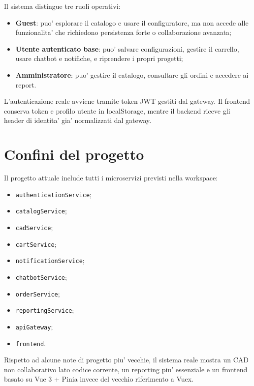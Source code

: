 Il sistema distingue tre ruoli operativi:

\begin{itemize}
\item \textbf{Guest}: puo' esplorare il catalogo e usare il configuratore, ma non accede alle funzionalita' che richiedono persistenza forte o collaborazione avanzata;
\item \textbf{Utente autenticato base}: puo' salvare configurazioni, gestire il carrello, usare chatbot e notifiche, e riprendere i propri progetti;
\item \textbf{Amministratore}: puo' gestire il catalogo, consultare gli ordini e accedere ai report.
\end{itemize}

L'autenticazione reale avviene tramite token JWT gestiti dal gateway. Il frontend conserva token e profilo utente in localStorage, mentre il backend riceve gli header di identita' gia' normalizzati dal gateway.

\section{Confini del progetto}

Il progetto attuale include tutti i microservizi previsti nella workspace:

\begin{itemize}
\item \texttt{authenticationService};
\item \texttt{catalogService};
\item \texttt{cadService};
\item \texttt{cartService};
\item \texttt{notificationService};
\item \texttt{chatbotService};
\item \texttt{orderService};
\item \texttt{reportingService};
\item \texttt{apiGateway};
\item \texttt{frontend}.
\end{itemize}

Rispetto ad alcune note di progetto piu' vecchie, il sistema reale mostra un CAD non collaborativo lato codice corrente, un reporting piu' essenziale e un frontend basato su Vue 3 + Pinia invece del vecchio riferimento a Vuex.
